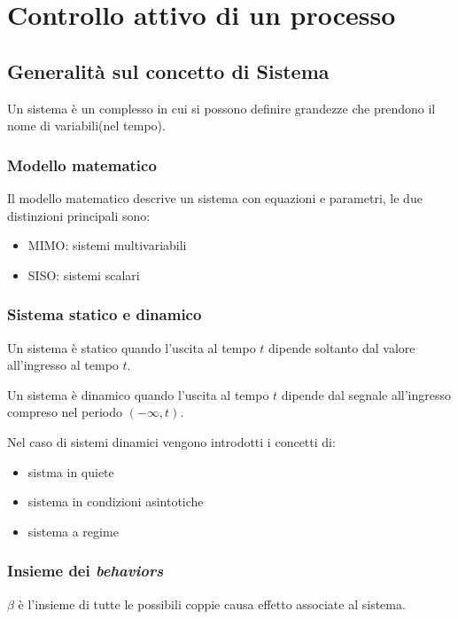\chapter{Controllo attivo di un processo}


\section{Generalit\`{a} sul concetto di Sistema}

Un sistema \`{e} un complesso in cui si possono definire grandezze che prendono il nome di variabili(nel tempo).

\subsection{Modello matematico}

Il modello matematico descrive un sistema con equazioni e parametri, le due distinzioni principali sono:
\begin{itemize}
  \item MIMO: sistemi multivariabili
  \item SISO: sistemi scalari
\end{itemize}

\subsection{Sistema statico e dinamico}
Un sistema \`{e} statico quando l'uscita al tempo $t$ dipende soltanto dal valore all'ingresso al tempo $t$.

Un sistema \`{e} dinamico quando l'uscita al tempo $t$ dipende dal segnale all'ingresso compreso nel periodo $(-\infty, t)$.


Nel caso di sistemi dinamici vengono introdotti i concetti di:
\begin{itemize}
  \item sistma in quiete
  \item sistema in condizioni asintotiche
  \item sistema a regime
\end{itemize}

\subsection{Insieme dei \textit{behaviors}}

$\beta$ \`{e} l'insieme di tutte le possibili coppie causa effetto associate al sistema.




